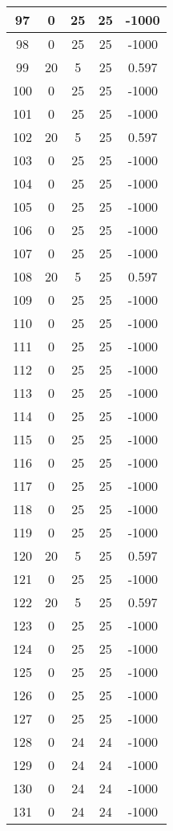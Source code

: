 \documentclass[letterpaper, 12pt]{article}
\begin{document}
\begin{longtable}{|c|c|c|c|c|}
\hline
97 & 0 & 25 & 25 & -1000 \\
\hline
98 & 0 & 25 & 25 & -1000 \\
\hline
99 & 20 & 5 & 25 & 0.597 \\
\hline
100 & 0 & 25 & 25 & -1000 \\
\hline
101 & 0 & 25 & 25 & -1000 \\
\hline
102 & 20 & 5 & 25 & 0.597 \\
\hline
103 & 0 & 25 & 25 & -1000 \\
\hline
104 & 0 & 25 & 25 & -1000 \\
\hline
105 & 0 & 25 & 25 & -1000 \\
\hline
106 & 0 & 25 & 25 & -1000 \\
\hline
107 & 0 & 25 & 25 & -1000 \\
\hline
108 & 20 & 5 & 25 & 0.597 \\
\hline
109 & 0 & 25 & 25 & -1000 \\
\hline
110 & 0 & 25 & 25 & -1000 \\
\hline
111 & 0 & 25 & 25 & -1000 \\
\hline
112 & 0 & 25 & 25 & -1000 \\
\hline
113 & 0 & 25 & 25 & -1000 \\
\hline
114 & 0 & 25 & 25 & -1000 \\
\hline
115 & 0 & 25 & 25 & -1000 \\
\hline
116 & 0 & 25 & 25 & -1000 \\
\hline
117 & 0 & 25 & 25 & -1000 \\
\hline
118 & 0 & 25 & 25 & -1000 \\
\hline
119 & 0 & 25 & 25 & -1000 \\
\hline
120 & 20 & 5 & 25 & 0.597 \\
\hline
121 & 0 & 25 & 25 & -1000 \\
\hline
122 & 20 & 5 & 25 & 0.597 \\
\hline
123 & 0 & 25 & 25 & -1000 \\
\hline
124 & 0 & 25 & 25 & -1000 \\
\hline
125 & 0 & 25 & 25 & -1000 \\
\hline
126 & 0 & 25 & 25 & -1000 \\
\hline
127 & 0 & 25 & 25 & -1000 \\
\hline
128 & 0 & 24 & 24 & -1000 \\
\hline
129 & 0 & 24 & 24 & -1000 \\
\hline
130 & 0 & 24 & 24 & -1000 \\
\hline
131 & 0 & 24 & 24 & -1000 \\

\end{longtable}
\end{document}
